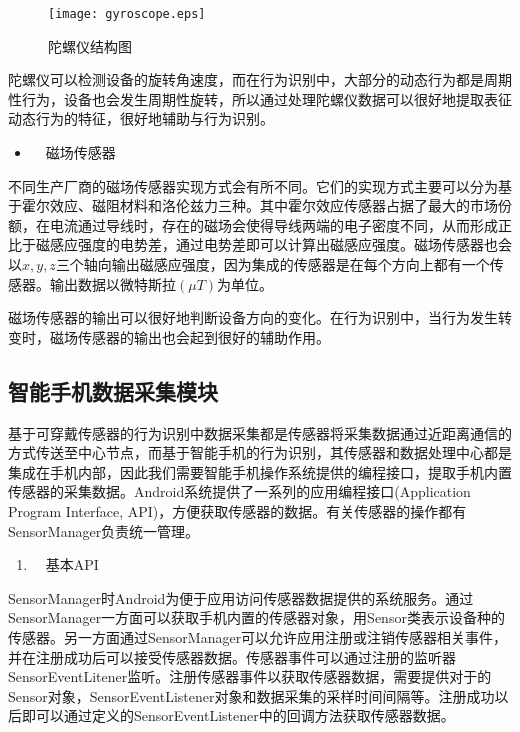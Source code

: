 \begin{figure}[htb]
\centering
\texttt{[image: gyroscope.eps]}
\caption{陀螺仪结构图} \label{gyroscope}
\end{figure}

\par 陀螺仪可以检测设备的旋转角速度，而在行为识别中，大部分的动态行为都是周期性行为，设备也会发生周期性旋转，所以通过处理陀螺仪数据可以很好地提取表征动态行为的特征，很好地辅助与行为识别。

\begin{itemize}
	\item　磁场传感器
\end{itemize}
\par 不同生产厂商的磁场传感器实现方式会有所不同。它们的实现方式主要可以分为基于霍尔效应、磁阻材料和洛伦兹力三种。其中霍尔效应传感器占据了最大的市场份额，在电流通过导线时，存在的磁场会使得导线两端的电子密度不同，从而形成正比于磁感应强度的电势差，通过电势差即可以计算出磁感应强度。磁场传感器也会以$x,  y,  z$三个轴向输出磁感应强度，因为集成的传感器是在每个方向上都有一个传感器。输出数据以微特斯拉$(\mu T)$为单位。
\par 磁场传感器的输出可以很好地判断设备方向的变化。在行为识别中，当行为发生转变时，磁场传感器的输出也会起到很好的辅助作用。

\subsection{智能手机数据采集模块}
\par 基于可穿戴传感器的行为识别中数据采集都是传感器将采集数据通过近距离通信的方式传送至中心节点，而基于智能手机的行为识别，其传感器和数据处理中心都是集成在手机内部，因此我们需要智能手机操作系统提供的编程接口，提取手机内置传感器的采集数据。Android系统提供了一系列的应用编程接口(Application Program Interface, API)，方便获取传感器的数据。有关传感器的操作都有SensorManager负责统一管理。

\begin{enumerate}[(1)]
	\item　基本API
\end{enumerate}
\par SensorManager时Android为便于应用访问传感器数据提供的系统服务。通过SensorManager一方面可以获取手机内置的传感器对象，用Sensor类表示设备种的传感器。另一方面通过SensorManager可以允许应用注册或注销传感器相关事件，并在注册成功后可以接受传感器数据。传感器事件可以通过注册的监听器SensorEventLitener监听。注册传感器事件以获取传感器数据，需要提供对于的Sensor对象，SensorEventListener对象和数据采集的采样时间间隔等。注册成功以后即可以通过定义的SensorEventListener中的回调方法获取传感器数据。

